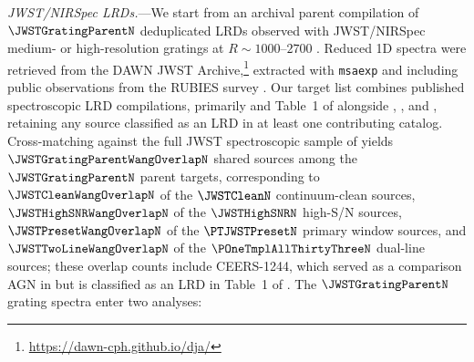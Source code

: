 \documentclass[twocolumn]{aastex631}
\begin{document}
\emph{JWST/NIRSpec LRDs.}---We start from an archival parent compilation of $\JWSTGratingParentN$ deduplicated LRDs observed with JWST/NIRSpec medium- or high-resolution gratings at $R \sim 1000$--$2700$ \citep{Jakobsen2022,deGraaffLSF2024}. Reduced 1D spectra were retrieved from the DAWN JWST Archive,\footnote{\url{https://dawn-cph.github.io/dja/}} extracted with \texttt{msaexp} \citep{msaexp} and including public observations from the RUBIES survey \citep{DJAdeGraaff2024}. Our target list combines published spectroscopic LRD compilations, primarily \citet{BaccusXu2026} and Table~1 of \citet{Yanagisawa2026} alongside \citet{Kocevski2025}, \citet{Taylor2025}, and \citet{Hviding2025}, retaining any source classified as an LRD in at least one contributing catalog. Cross-matching against the full JWST spectroscopic sample of \citet{Wang2026} yields $\JWSTGratingParentWangOverlapN$ shared sources among the $\JWSTGratingParentN$ parent targets, corresponding to $\JWSTCleanWangOverlapN$ of the $\JWSTCleanN$ continuum-clean sources, $\JWSTHighSNRWangOverlapN$ of the $\JWSTHighSNRN$ high-S/N sources, $\JWSTPresetWangOverlapN$ of the $\PTJWSTPresetN$ primary window sources, and $\JWSTTwoLineWangOverlapN$ of the $\POneTmplAllThirtyThreeN$ dual-line sources; these overlap counts include CEERS-1244, which served as a comparison AGN in \citet{Wang2026} but is classified as an LRD in Table~1 of \citet{Yue2024}. The $\JWSTGratingParentN$ grating spectra enter two analyses:
\end{document}
